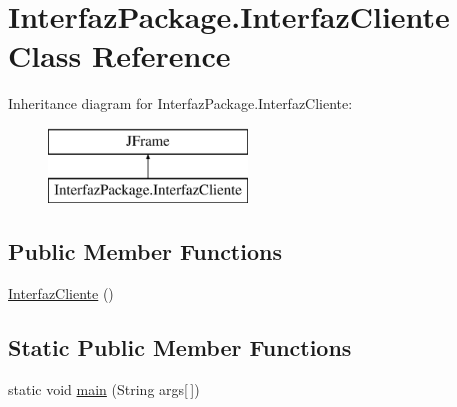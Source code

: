 \hypertarget{class_interfaz_package_1_1_interfaz_cliente}{}\section{Interfaz\+Package.\+Interfaz\+Cliente Class Reference}
\label{class_interfaz_package_1_1_interfaz_cliente}
Inheritance diagram for Interfaz\+Package.\+Interfaz\+Cliente\+:\begin{figure}[H]
\begin{center}
\leavevmode
\includegraphics[height=2.000000cm]{class_interfaz_package_1_1_interfaz_cliente}
\end{center}
\end{figure}
\subsection*{Public Member Functions}
\begin{DoxyCompactItemize}
\item 
\mbox{\hyperlink{class_interfaz_package_1_1_interfaz_cliente_a7e351585e987550c8e46079535f65537}{Interfaz\+Cliente}} ()
\end{DoxyCompactItemize}
\subsection*{Static Public Member Functions}
\begin{DoxyCompactItemize}
\item 
static void \mbox{\hyperlink{class_interfaz_package_1_1_interfaz_cliente_ac31582969c3d4036dd821f14fe9fae9f}{main}} (String args\mbox{[}$\,$\mbox{]})
\end{DoxyCompactItemize}

